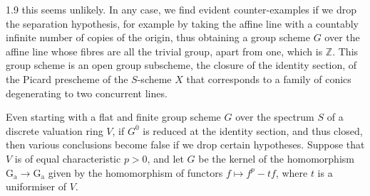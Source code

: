 \begin{remarks}{1.9}
    this seems unlikely.
    In any case, we find evident counter-examples if we drop the separation hypothesis, for example by taking the affine line with a countably infinite number of copies of the origin, thus obtaining a group scheme \(G\) over the affine line whose fibres are all the trivial group, apart from one, which is \(\mathbb {Z}\).
    This group scheme is an open group subscheme, the closure of the identity section, of the Picard prescheme of the \(S\)-scheme \(X\) that corresponds to a family of conics degenerating to two concurrent lines.\par{}Even starting with a flat and finite group scheme \(G\) over the spectrum \(S\) of a discrete valuation ring \(V\), if \(G^0\) is reduced at the identity section, and thus closed, then various conclusions become false if we drop certain hypotheses.
    Suppose that \(V\) is of equal characteristic \(p>0\), and let \(G\) be the kernel of the homomorphism \(\operatorname {G_a}\to \operatorname {G_a}\) given by the homomorphism of functors \(f\mapsto  f^p-tf\), where \(t\) is a uniformiser of \(V\).
    

\end{remarks}
